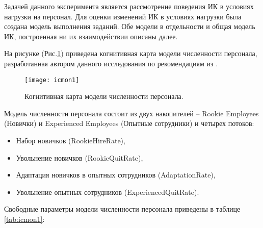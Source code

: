 Задачей данного эксперимента является рассмотрение поведения ИК в условиях нагрузки на персонал. 
Для оценки изменений ИК в условиях нагрузки была создана модель выполнения заданий. 
Обе модели в отдельности и общая модель ИК, построенная ни их взаимодействии описаны далее. 

На рисунке (Рис.\ref{fig:icmon1}) приведена когнитивная карта модели численности персонала, разработанная автором данного исследования по рекомендациям из \cite{oliva2010d} .

\begin{figure}[H]
  \caption{Когнитивная карта модели численности персонала.}
  \centering
    \texttt{[image: icmon1]}
  \label{fig:icmon1}
\end{figure}  

Модель численности персонала состоит из двух накопителей – Rookie Employees (Новички) и Experienced Employees (Опытные сотрудники) и четырех потоков: 

\begin{itemize}
\tightlist
\item Набор новичков (RookieHireRate),
\item Увольнение новичков (RookieQuitRate),
\item Адаптация новичков в опытных сотрудников (AdaptationRate),
\item Увольнение опытных сотрудников (ExperiencedQuitRate).
\end{itemize}

Свободные параметры модели численности персонала приведены в таблице \ref{tab:icmon1}: 

\begin{table}[H]
\centering
\caption{Свободные параметры модели численности персонала.}
\label{tab:icmon1}
\end{table}

